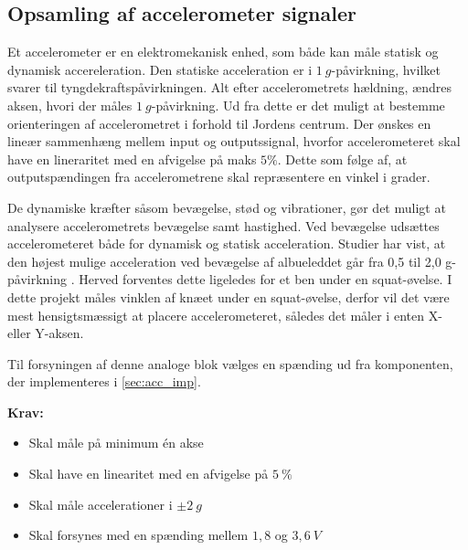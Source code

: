 \subsection{Opsamling af accelerometer signaler} \label{sec:acc_teori}
Et accelerometer er en elektromekanisk enhed, som både kan måle statisk og dynamisk accereleration. 
Den statiske acceleration er i $1~g$-påvirkning, hvilket svarer til tyngdekraftspåvirkningen. 
Alt efter accelerometrets hældning, ændres aksen, hvori der måles $1~g$-påvirkning. 
Ud fra dette er det muligt at bestemme orienteringen af accelerometret i forhold til Jordens centrum. 
Der ønskes en lineær sammenhæng mellem input og outputssignal, hvorfor accelerometeret skal have en lineraritet med en afvigelse på maks $5\%$. Dette som følge af, at outputspændingen fra accelerometrene skal repræsentere en vinkel i grader.

De dynamiske kræfter såsom bevægelse, stød og vibrationer, gør det muligt at analysere accelerometrets bevægelse samt hastighed. 
Ved bevægelse udsættes accelerometeret både for dynamisk og statisk acceleration. 
Studier har vist, at den højest mulige acceleration ved bevægelse af albueleddet går fra 0,5 til 2,0 g-påvirkning \citep{bernmarka2002}. 
Herved forventes dette ligeledes for et ben under en squat-øvelse. 
I dette projekt måles vinklen af knæet under en squat-øvelse, derfor vil det være mest hensigtsmæssigt at placere accelerometeret, således det måler i enten X- eller Y-aksen. 

Til forsyningen af denne analoge blok vælges en spænding ud fra komponenten, der implementeres i \autoref{sec:acc_imp}.



\vspace{3mm}
\textbf{Krav:}
\begin{itemize}
\item Skal måle på minimum én akse
\item Skal have en linearitet med en afvigelse på $5~\%$
\item Skal måle accelerationer i $\pm 2~g$
\item Skal forsynes med en spænding mellem $1,8$ og $3,6~V$
\end{itemize}